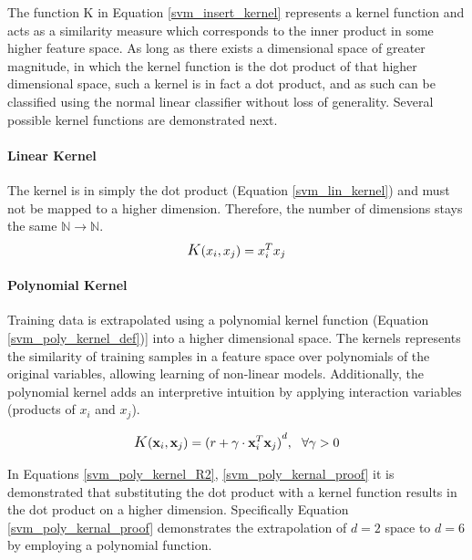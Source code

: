 	The function K in Equation \ref{svm_insert_kernel} represents a kernel function and acts as a similarity measure which corresponds to the inner product in some higher feature space. As long as there exists a dimensional space of greater magnitude, in which the kernel function is the dot product of that higher dimensional space, such a kernel is in fact a dot product, and as such can be classified using the normal linear classifier without loss of generality. Several possible kernel functions are demonstrated next.
	
	\par	
	
	\paragraph{Linear Kernel}
		The kernel is in simply the dot product (Equation \ref{svm_lin_kernel}) and must not be mapped to a higher dimension. Therefore, the number of dimensions stays the same $ \mathbb{N} \rightarrow \mathbb{N} $.
		\begin{equation}
			\mathlarger{K}(x_i,x_j) = x_i^T x_j
			\label{svm_lin_kernel}
		\end{equation}
	
	\paragraph{Polynomial Kernel}
		Training data is extrapolated using a polynomial kernel function (Equation \ref{svm_poly_kernel_def})] into a higher dimensional space. The kernels represents the similarity of training samples in a feature space over polynomials of the original variables, allowing learning of non-linear models. Additionally, the polynomial kernel adds an interpretive intuition by applying interaction variables (products of $ x_i $ and $ x_j $).
		
		\begin{equation}
			\begin{aligned}
				\mathlarger{K}(\textbf{x}_i,\textbf{x}_j) = {(r + \gamma \cdot \textbf{x}_i^T \textbf{x}_j)}^d, \ \ \forall \gamma > 0 
			\end{aligned}
		\label{svm_poly_kernel_def}
		\end{equation}
		
		In Equations \ref{svm_poly_kernel_R2}, \ref{svm_poly_kernal_proof} it is demonstrated that substituting the dot product with a kernel function results in the dot product on a higher dimension. Specifically Equation \ref{svm_poly_kernal_proof} demonstrates the extrapolation of $ d=2 $ space to $ d=6 $ by employing a polynomial function.
		
